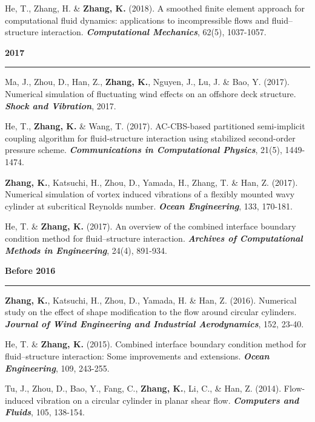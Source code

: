 \documentclass[10pt]{article}
\begin{document}
{\begin{etaremune}
  \item He, T., Zhang, H. \& \textbf{Zhang, K.} (2018). A smoothed finite element approach for computational fluid dynamics: applications to incompressible flows and fluid–structure interaction. \textit{\textbf{Computational Mechanics}}, 62(5), 1037-1057.

 \item [] {\bf \color{Blue} 2017 \rule{14.8cm}{0.2mm}}   

  \item Ma, J., Zhou, D., Han, Z., \textbf{Zhang, K.}, Nguyen, J., Lu, J. \& Bao, Y. (2017). Numerical simulation of fluctuating wind effects on an offshore deck structure. \textit{\textbf{Shock and Vibration}}, 2017.
  \item He, T., \textbf{Zhang, K.} \& Wang, T. (2017). AC-CBS-based partitioned semi-implicit coupling algorithm for fluid-structure interaction using stabilized second-order pressure scheme. \textit{\textbf{Communications in Computational Physics}}, 21(5), 1449-1474.
  
  \item \textbf{Zhang, K.}, Katsuchi, H., Zhou, D., Yamada, H., Zhang, T. \& Han, Z. (2017). Numerical simulation of vortex induced vibrations of a flexibly mounted wavy cylinder at subcritical Reynolds number. \textit{\textbf{Ocean Engineering}}, 133, 170-181.
  
  \item He, T. \& \textbf{Zhang, K.} (2017). An overview of the combined interface boundary condition method for fluid–structure interaction. \textit{\textbf{Archives of Computational Methods in Engineering}}, 24(4), 891-934.
  
 \item [] {\bf \color{Blue} Before 2016 \rule{13.6cm}{0.2mm}}   

  \item \textbf{Zhang, K.}, Katsuchi, H., Zhou, D., Yamada, H. \& Han, Z. (2016). Numerical study on the effect of shape modification to the flow around circular cylinders. \textit{\textbf{Journal of Wind Engineering and Industrial Aerodynamics}}, 152, 23-40.  

  \item He, T. \& \textbf{Zhang, K.} (2015). Combined interface boundary condition method for fluid–structure interaction: Some improvements and extensions. \textit{\textbf{Ocean Engineering}}, 109, 243-255.
  
  \item Tu, J., Zhou, D., Bao, Y., Fang, C., \textbf{Zhang, K.}, Li, C., \& Han, Z. (2014). Flow-induced vibration on a circular cylinder in planar shear flow. \textit{\textbf{Computers and Fluids}}, 105, 138-154.

\end{etaremune}
}
\end{document}

